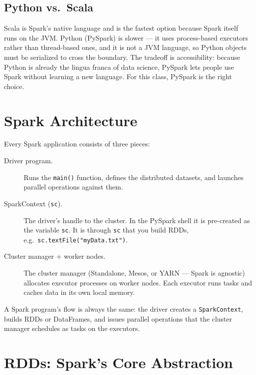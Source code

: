 \documentclass[11pt]{article}
\begin{document}
\subsection{Python vs.\ Scala}
Scala is Spark's native language and is the fastest option because Spark itself runs on the JVM. Python (PySpark) is slower --- it uses process-based executors rather than thread-based ones, and it is not a JVM language, so Python objects must be serialized to cross the boundary. The tradeoff is accessibility: because Python is already the lingua franca of data science, PySpark lets people use Spark without learning a new language. For this class, PySpark is the right choice.


\section{Spark Architecture}

Every Spark application consists of three pieces:

\begin{description}
    \item[Driver program.] Runs the \texttt{main()} function, defines the distributed datasets, and launches parallel operations against them.
    \item[SparkContext (\texttt{sc}).] The driver's handle to the cluster. In the PySpark shell it is pre-created as the variable \texttt{sc}. It is through \texttt{sc} that you build RDDs, e.g.\ \texttt{sc.textFile("myData.txt")}.
    \item[Cluster manager + worker nodes.] The cluster manager (Standalone, Mesos, or YARN --- Spark is agnostic) allocates executor processes on worker nodes. Each executor runs tasks and caches data in its own local memory.
\end{description}

A Spark program's flow is always the same: the driver creates a \texttt{SparkContext}, builds RDDs or DataFrames, and issues parallel operations that the cluster manager schedules as tasks on the executors.


\section{RDDs: Spark's Core Abstraction}
\end{document}
